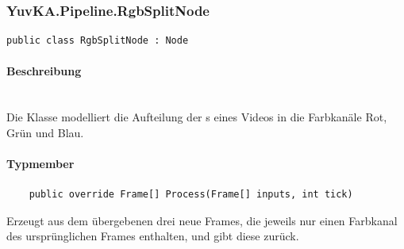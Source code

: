 \subsubsection{YuvKA.Pipeline.RgbSplitNode}

\begin{verbatim}
public class RgbSplitNode : Node
\end{verbatim}

\paragraph{Beschreibung}~\\
Die Klasse  modelliert die Aufteilung der s eines Videos in die Farbkanäle Rot, Grün und Blau.

\paragraph{Typmember}
\begin{itemize}

	\begin{verbatim}
	public override Frame[] Process(Frame[] inputs, int tick)
	\end{verbatim}
	Erzeugt aus dem übergebenen  drei neue Frames, die jeweils nur einen Farbkanal des ursprünglichen Frames enthalten, und gibt diese zurück.
	
\end{itemize}
